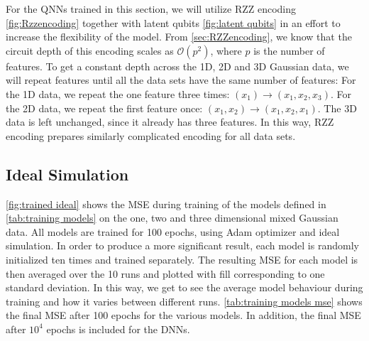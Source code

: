 For the QNNs trained in this section, we will utilize RZZ encoding \autoref{fig:Rzzencoding} together with latent qubits \autoref{fig:latent qubits} in an effort to increase the flexibility of the model. From \autoref{sec:RZZencoding}, we know that the circuit depth of this encoding scales as $\mathcal{O}(p^2)$, where $p$ is the number of features. To get a constant depth across the 1D, 2D and 3D Gaussian data, we will repeat features until all the data sets have the same number of features: For the 1D data, we repeat the one feature three times: $(x_1) \rightarrow (x_1, x_2, x_3)$. For the 2D data, we repeat the first feature once: $(x_1, x_2) \rightarrow (x_1, x_2, x_1)$. The 3D data is left unchanged, since it already has three features. In this way, RZZ encoding prepares similarly complicated encoding for all data sets.


\subsection{Ideal Simulation}\label{sec:Ideal Simulation}
\autoref{fig:trained ideal} shows the MSE during training of the models defined in \autoref{tab:training models} on the one, two and three dimensional mixed Gaussian data. All models are trained for 100 epochs, using Adam optimizer and ideal simulation. In order to produce a more significant result, each model is randomly initialized ten times and trained separately. The resulting MSE for each model is then averaged over the 10 runs and plotted with fill corresponding to one standard deviation. In this way, we get to see the average model behaviour during training and how it varies between different runs. \autoref{tab:training models mse} shows the final MSE after 100 epochs for the various models. In addition, the final MSE after $10^4$ epochs is included for the DNNs.   


